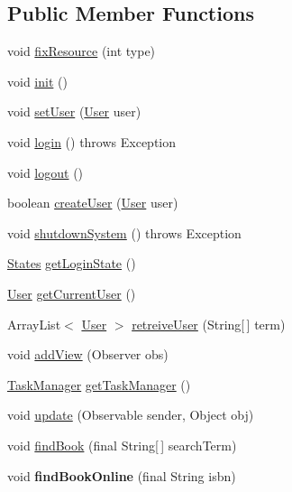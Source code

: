 \subsection*{Public Member Functions}
\begin{DoxyCompactItemize}
\item 
void \hyperlink{classw3se_1_1_model_1_1_i_m_s_ae546fffe1533cb2adafa4f3f735ec37f}{fix\-Resource} (int type)
\item 
void \hyperlink{classw3se_1_1_model_1_1_i_m_s_aa4ed679904df52d4b1bceb5586ea042d}{init} ()
\item 
void \hyperlink{classw3se_1_1_model_1_1_i_m_s_aa1d765c2fc2b70f03208c9c30db07d9c}{set\-User} (\hyperlink{classw3se_1_1_model_1_1_base_1_1_user}{User} user)
\item 
void \hyperlink{classw3se_1_1_model_1_1_i_m_s_a68f2ed3352f3347fed480d850724c988}{login} ()  throws Exception 	
\item 
void \hyperlink{classw3se_1_1_model_1_1_i_m_s_ada719119ffda91e5d46f10b75a54c5a1}{logout} ()
\item 
boolean \hyperlink{classw3se_1_1_model_1_1_i_m_s_ac13bf07b40bcad32fcc338b56f19ccb1}{create\-User} (\hyperlink{classw3se_1_1_model_1_1_base_1_1_user}{User} user)
\item 
void \hyperlink{classw3se_1_1_model_1_1_i_m_s_a803bb73ffda01fd745ece60babbea33e}{shutdown\-System} ()  throws Exception 	
\item 
\hyperlink{enumw3se_1_1_model_1_1_base_1_1_states}{States} \hyperlink{classw3se_1_1_model_1_1_i_m_s_a4ef12001415807efd9513957694fcbd6}{get\-Login\-State} ()
\item 
\hyperlink{classw3se_1_1_model_1_1_base_1_1_user}{User} \hyperlink{classw3se_1_1_model_1_1_i_m_s_ae774c67ee9c462cb6c4a5859620aba12}{get\-Current\-User} ()
\item 
Array\-List$<$ \hyperlink{classw3se_1_1_model_1_1_base_1_1_user}{User} $>$ \hyperlink{classw3se_1_1_model_1_1_i_m_s_ac2c8d002aa4780961ba29d5626b79255}{retreive\-User} (String\mbox{[}$\,$\mbox{]} term)
\item 
void \hyperlink{classw3se_1_1_model_1_1_i_m_s_ae51dffebb9f471aa4cc3cb021770ec30}{add\-View} (Observer obs)
\item 
\hyperlink{classw3se_1_1_model_1_1_task_manager}{Task\-Manager} \hyperlink{classw3se_1_1_model_1_1_i_m_s_a4b93d7cae26d77160f4f4f91a6e2efee}{get\-Task\-Manager} ()
\item 
void \hyperlink{classw3se_1_1_model_1_1_i_m_s_ac799433c308fa25d3169985e1b5f0a75}{update} (Observable sender, Object obj)
\item 
void \hyperlink{classw3se_1_1_model_1_1_i_m_s_a98316f568225d1b294445c2079a2537c}{find\-Book} (final String\mbox{[}$\,$\mbox{]} search\-Term)
\item 
\hypertarget{classw3se_1_1_model_1_1_i_m_s_ac446043dfe1f5aa7dfb0845c23a04645}{void {\bfseries find\-Book\-Online} (final String isbn)}\label{classw3se_1_1_model_1_1_i_m_s_ac446043dfe1f5aa7dfb0845c23a04645}


\end{DoxyCompactItemize}
